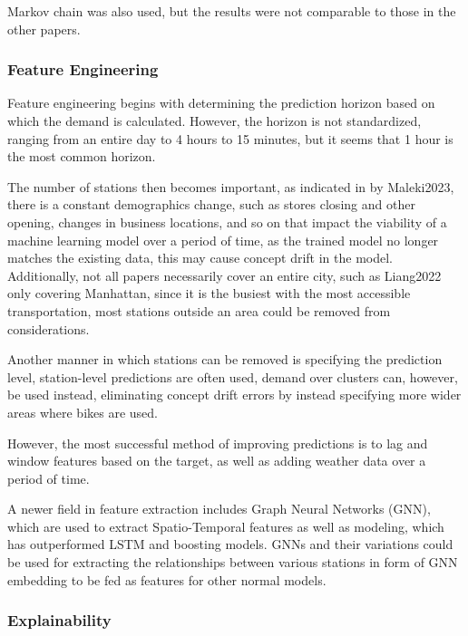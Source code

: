 \documentclass{article}
\begin{document}
Markov chain was also used\cite{Zhou2018}, but the results were not comparable to those in the other papers.

\subsubsection{Feature Engineering}

Feature engineering begins with determining the prediction horizon based on which the demand is calculated. However, the horizon is not standardized, ranging from an entire day\cite{Zhou2018} to 4 hours\cite{Liang2022} to 15 minutes\cite{Mehdi2022}, but it seems that 1 hour is the most common horizon.

The number of stations then becomes important, as indicated in by Maleki2023\cite{Maleki2023}, there is a constant demographics change, such as stores closing and other opening, changes in business locations, and so on that impact the viability of a machine learning model over a period of time, as the trained model no longer matches the existing data, this may cause concept drift\cite{evidently2024} in the model. Additionally, not all papers necessarily cover an entire city, such as Liang2022\cite{Liang2022} only covering Manhattan, since it is the busiest with the most accessible transportation, most stations outside an area could be removed from considerations.

Another manner in which stations can be removed is specifying the prediction level, station-level predictions are often used\cite{Liang2022}\cite{Seo2021}, demand over clusters can, however, be used instead\cite{Mehdi2022}, eliminating concept drift errors by instead specifying more wider areas where bikes are used.

However, the most successful method of improving predictions is to lag and window features based on the target, as well as adding weather data over a period of time\cite{Mehdi2022}\cite{Seo2021}.

A newer field in feature extraction includes Graph Neural Networks (GNN), which are used to extract Spatio-Temporal features as well as modeling\cite{Liang2022}, which has outperformed LSTM and boosting models. GNNs and their variations could be used for extracting the relationships between various stations in form of GNN embedding to be fed as features for other normal models.

\subsubsection{Explainability}
\end{document}
